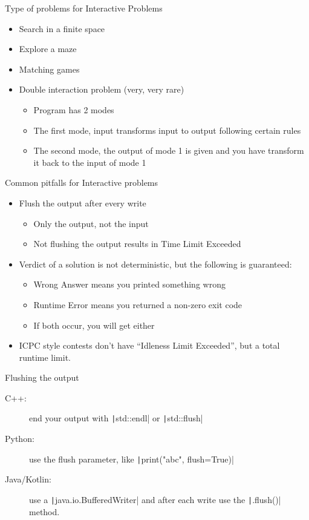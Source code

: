 \documentclass[11pt,pdf, aspectratio=169]{beamer}
\begin{document}
  \begin{frame}{Type of problems for Interactive Problems}
    \begin{itemize}
      \item Search in a finite space
      \item Explore a maze
      \item Matching games
      \item Double interaction problem (very, very rare)
      \begin{itemize}
        \item Program has 2 modes
        \item The first mode, input transforms input to output following certain rules
        \item The second mode, the output of mode 1 is given and you have transform it back to the input of mode 1
      \end{itemize}
    \end{itemize}
  \end{frame}
  \begin{frame}{Common pitfalls for Interactive problems}
    \begin{itemize}
      \item Flush the output after every write
      \begin{itemize}
        \item Only the output, not the input
        \item Not flushing the output results in Time Limit Exceeded
      \end{itemize}
      \item Verdict of a solution is not deterministic, but the following is guaranteed:
      \begin{itemize}
        \item Wrong Answer means you printed something wrong
        \item Runtime Error means you returned a non-zero exit code
        \item If both occur, you will get either
      \end{itemize}
      \item ICPC style contests don't have ``Idleness Limit Exceeded'', but a total runtime limit.
    \end{itemize}
  \end{frame}
  \begin{frame}{Flushing the output}
    \begin{description}
      \item[C++:] end your output with \texttt|std::endl| or \texttt|std::flush|
      \item[Python:] use the flush parameter, like \texttt|print("abc", flush=True)|
      \item[Java/Kotlin:] use a \texttt|java.io.BufferedWriter| and after each write use the \texttt|.flush()| method.
    \end{description}
  \end{frame}
\end{document}
